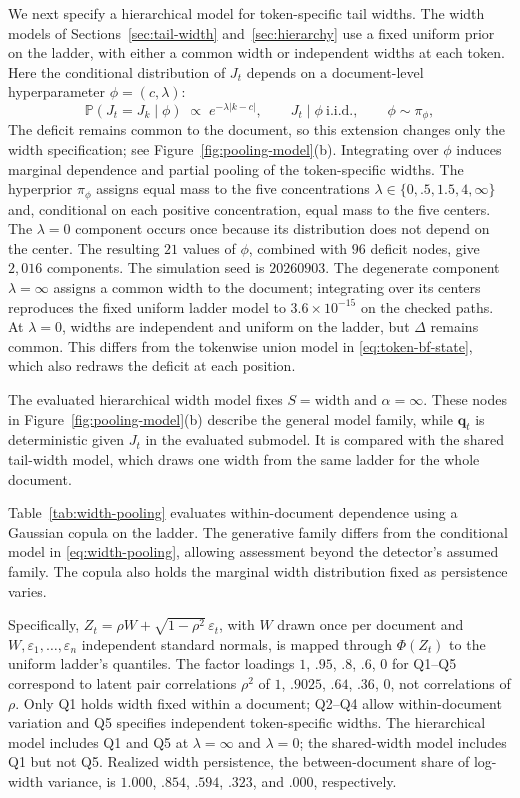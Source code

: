 \documentclass[11pt]{article}
\newcommand{\Prb}{\mathbb P}
\begin{document}
We next specify a hierarchical model for token-specific tail widths.  The
width models of Sections~\ref{sec:tail-width} and~\ref{sec:hierarchy} use a fixed
uniform prior on the ladder, with either a
common width or independent widths at each token.  Here the conditional
distribution of $J_t$ depends on a document-level hyperparameter
$\phi=(c,\lambda)$:
\begin{equation}
  \Prb(J_t=J_k\mid\phi)\;\propto\;e^{-\lambda|k-c|},\qquad
  J_t\mid\phi\ \text{i.i.d.},\qquad \phi\sim\pi_\phi,
  \label{eq:width-pooling}
\end{equation}
The deficit remains common to the document, so this extension changes only the
width specification; see Figure~\ref{fig:pooling-model}(b).  Integrating over
$\phi$ induces marginal dependence and partial pooling of the token-specific
widths.  The hyperprior $\pi_\phi$ assigns equal mass to the five concentrations
$\lambda\in\{0,.5,1.5,4,\infty\}$ and, conditional on each positive
concentration, equal mass to the five centers.  The $\lambda=0$ component occurs
once because its distribution does not depend on the center.  The resulting
$21$ values of $\phi$, combined with $96$ deficit nodes, give $2{,}016$
components.  The simulation seed is $20260903$.  The degenerate component
$\lambda=\infty$ assigns a common width to the document; integrating over its
centers reproduces the fixed uniform ladder model to $3.6\times10^{-15}$ on the
checked paths.  At $\lambda=0$, widths are independent and uniform on the
ladder, but $\Delta$ remains common.  This differs from the tokenwise union
model in \eqref{eq:token-bf-state}, which also redraws the deficit at each position.

The evaluated hierarchical width model fixes $S=\mathrm{width}$ and
$\alpha=\infty$.  These nodes in Figure~\ref{fig:pooling-model}(b) describe the
general model family, while $\bm q_t$ is deterministic given $J_t$ in the
evaluated submodel.  It is compared with the shared tail-width model, which
draws one width from the same ladder for the whole document.

Table~\ref{tab:width-pooling} evaluates within-document dependence using a
Gaussian copula on the ladder.  The generative family differs from the
conditional model in \eqref{eq:width-pooling}, allowing assessment beyond the
detector's assumed family.  The copula also holds the marginal width
distribution fixed as persistence varies.

Specifically, $Z_t=\rho W+\sqrt{1-\rho^2}\,\varepsilon_t$, with $W$ drawn once per
document and $W,\varepsilon_1,\ldots,\varepsilon_n$ independent standard normals, is mapped through $\Phi(Z_t)$ to
the uniform ladder's quantiles.  The factor loadings $1$, $.95$, $.8$, $.6$, $0$
for Q1--Q5 correspond to latent pair correlations $\rho^2$ of $1$, $.9025$, $.64$,
$.36$, $0$, not correlations of $\rho$.  Only Q1 holds width fixed within a
document; Q2--Q4 allow within-document variation and Q5 specifies independent
token-specific widths.  The hierarchical model includes Q1 and Q5 at
$\lambda=\infty$ and $\lambda=0$; the shared-width model includes Q1 but not Q5.
Realized width persistence,
the between-document share of log-width variance, is $1.000$, $.854$, $.594$,
$.323$, and $.000$, respectively.
\end{document}

